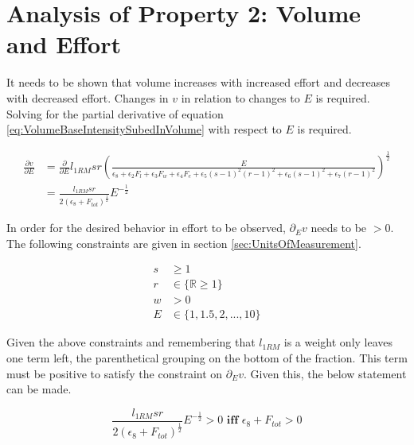 \section{Analysis of Property 2: Volume and Effort}
\label{sec:VolumeBasePotentialSurfaceProperty2}

It needs to be shown that volume increases with increased effort and decreases with decreased effort. Changes in $v$ in relation to changes to $E$ is required. Solving for the partial derivative of equation \ref{eq:VolumeBaseIntensitySubedInVolume} with respect to $E$ is required.

\begin{equation*}
	\begin{split}
		\frac{\partial v}{\partial E} & =
		\frac{\partial}{\partial E} l_{1RM} sr \left( 
    			\frac{
    				E
    			}{
    				\epsilon_8+
    				\epsilon_2 F_l+
    				\epsilon_3 F_w+
    				\epsilon_4 F_e+
    				\epsilon_5 (s-1)^2(r-1)^2+
    				\epsilon_6 (s-1)^2+
    				\epsilon_7 (r-1)^2
    			}
    		\right)^{\frac{1}{2}}
    		\\
    		& = \frac{
    			l_{1RM} sr
    		}{
    			2 \left(\epsilon_8+F_{tot} \right)^{\frac{1}{2}}
    		} E^{-\frac{1}{2}}
    	\end{split}
\end{equation*}

In order for the desired behavior in effort to be observed, $\partial_E v$ needs to be $>0$. The following constraints are given in section \ref{sec:UnitsOfMeasurement}.

\begin{equation*}
	\begin{split}
		s & \ge 1 \\
		r & \in\{\mathbb{R} \ge 1 \} \\
		w & >0 \\
		E & \in\{1,1.5,2,...,10\}
	\end{split}
\end{equation*}

Given the above constraints and remembering that $l_{1RM}$ is a weight only leaves one term left, the parenthetical grouping on the bottom of the fraction. This term must be positive to satisfy the constraint on $\partial_E v$. Given this, the below statement can be made.

\begin{equation*}
	\frac{
    			l_{1RM} sr
    		}{
    			2 \left(\epsilon_8+F_{tot} \right)^{\frac{1}{2}}
    		} E^{-\frac{1}{2}} >0 \textbf{ iff }\epsilon_8+F_{tot}>0
\end{equation*}

